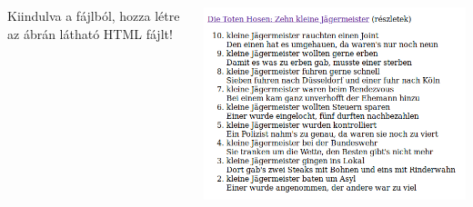 \begin{frame}
  \begin{columns}[c]
      Kiindulva a  fájlból, hozza létre az ábrán látható HTML fájlt!
      \begin{exampleblock}{}
        \centering \includegraphics[width=\textwidth]{jaegermeister.png}
      \end{exampleblock}
  \end{columns}
\end{frame}


